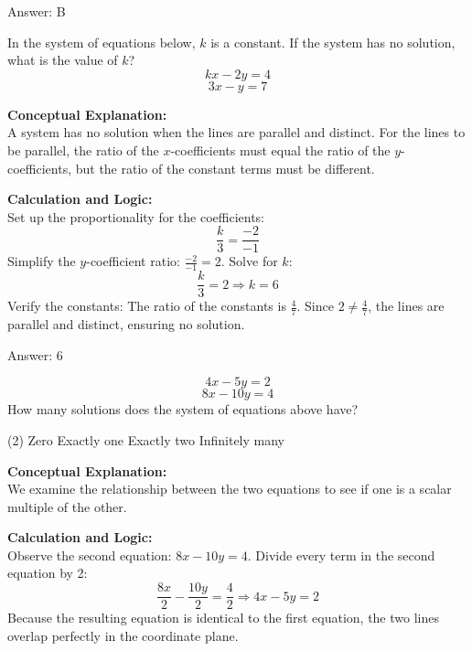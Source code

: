 \documentclass[11pt,paper=a4,answers]{exam}
\begin{document}
\begin{questions}
\begin{solution}
\vspace{15pt}
Answer: \colorbox{yellow!100}{B}
\end{solution}

\question
In the system of equations below, $k$ is a constant. If the system has no solution, what is the value of $k$?
\[ kx - 2y = 4 \]
\[ 3x - y = 7 \]

\begin{solution}
\textbf{Conceptual Explanation:} \\
A system has no solution when the lines are parallel and distinct. For the lines to be parallel, the ratio of the $x$-coefficients must equal the ratio of the $y$-coefficients, but the ratio of the constant terms must be different.

\vspace{10pt}
\textbf{Calculation and Logic:} \\
Set up the proportionality for the coefficients:
\[ \frac{k}{3} = \frac{-2}{-1} \]
Simplify the $y$-coefficient ratio: $\frac{-2}{-1} = 2$.
Solve for $k$:
\[ \frac{k}{3} = 2 \Rightarrow k = 6 \]
Verify the constants: The ratio of the constants is $\frac{4}{7}$. Since $2 \neq \frac{4}{7}$, the lines are parallel and distinct, ensuring no solution.

\vspace{15pt}
Answer: \colorbox{yellow!100}{6}
\end{solution}

\question
\[ 4x - 5y = 2 \]
\[ 8x - 10y = 4 \]
How many solutions does the system of equations above have?
\begin{tasks}(2)
    \task Zero
    \task Exactly one
    \task Exactly two
    \task Infinitely many
\end{tasks}

\begin{solution}
\textbf{Conceptual Explanation:} \\
We examine the relationship between the two equations to see if one is a scalar multiple of the other.

\vspace{10pt}
\textbf{Calculation and Logic:} \\
Observe the second equation: $8x - 10y = 4$.
Divide every term in the second equation by 2:
\[ \frac{8x}{2} - \frac{10y}{2} = \frac{4}{2} \Rightarrow 4x - 5y = 2 \]
Because the resulting equation is identical to the first equation, the two lines overlap perfectly in the coordinate plane.


\end{solution}
\end{questions}
\end{document}
